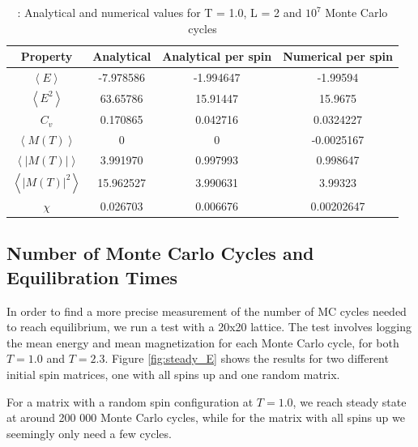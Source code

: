\documentclass{article}
\begin{document}
	{\renewcommand{\arraystretch}{1.5}
	\begin{table}[h!]
		\caption{: Analytical and numerical values for T = 1.0, L = 2 and $10^7$ Monte Carlo cycles }
			\label{Tab: values}
			\centering
		\begin{tabular}{c c c c}
			Property & Analytical & Analytical per spin & Numerical per spin \\
			\hline
			$\left<E\right>$ & -7.978586  & -1.994647 & -1.99594\\
			$\left<E^2\right>$ & 63.65786 & 15.91447 &15.9675 \\
			$C_v$ & 0.170865 & 0.042716 & 0.0324227 \\
			$\left<M(T)\right>$  & 0 & 0 & -0.0025167\\
			$\left<|M(T)|\right>$ & 3.991970 & 0.997993 & 0.998647 \\
			$\left<|M(T)|^2\right> $ & 15.962527 & 3.990631 & 3.99323\\
			$\chi$ & 0.026703 & 0.006676 & 0.00202647\\
		\end{tabular}
	\end{table}

\subsection{Number of Monte Carlo Cycles and Equilibration Times}
	In order to find a more precise measurement of the number of MC cycles needed to reach equilibrium, we run a test with a 20x20 lattice. The test involves logging the mean energy and mean magnetization for each Monte Carlo cycle, for both $T=1.0$ and $T=2.3$. Figure \ref{fig:steady_E} shows the results for two different initial spin matrices, one with all spins up and one random matrix.

	For a matrix with a random spin configuration at $T=1.0$, we reach steady state at around 200 000 Monte Carlo cycles, while for the matrix with all spins up we seemingly only need a few cycles.

}
\end{document}
